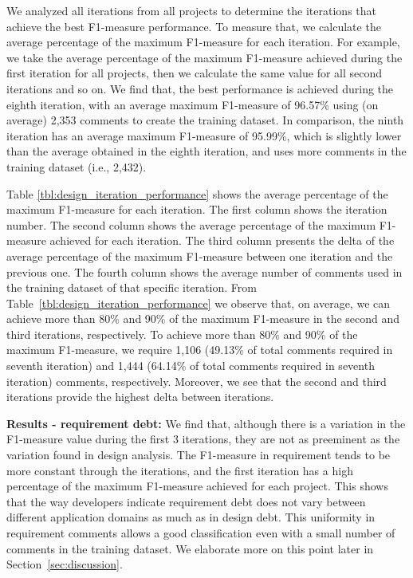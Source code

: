 We analyzed all iterations from all projects to determine the iterations that achieve the best F1-measure performance. To measure that, we calculate the average percentage of the maximum F1-measure for each iteration. For example, we take the average percentage of the maximum F1-measure achieved during the first iteration for all projects, then we calculate the same value for all second iterations and so on. We find that, the best performance is achieved during the eighth iteration, with an average maximum F1-measure of 96.57\% using (on average) 2,353 comments to create the training dataset. In comparison, the ninth iteration has an average  maximum F1-measure of 95.99\%, which is slightly lower than the average obtained in the eighth iteration, and uses more comments in the training dataset (i.e., 2,432).

Table \ref{tbl:design_iteration_performance} shows the average percentage of the maximum F1-measure for each iteration. The first column shows the iteration number. The second column shows the average percentage of the maximum F1-measure achieved for each iteration. The third column presents the delta of the average percentage of the maximum F1-measure between one iteration and the previous one. The fourth column shows the average number of comments used in the training dataset of that specific iteration. From Table~\ref{tbl:design_iteration_performance} we observe that, on average, we can achieve more than 80\% and 90\% of the maximum F1-measure in the second and third iterations, respectively. To achieve more than 80\% and 90\% of the maximum F1-measure, we require 1,106 (49.13\% of total comments required in seventh iteration) and 1,444 (64.14\% of total comments required in seventh iteration) comments, respectively. Moreover, we see that the second and third iterations provide the highest delta between iterations.

\noindent \textbf{Results - requirement debt:} We find that, although there is a variation in the F1-measure value during the first 3 iterations, they are not as preeminent as the variation found in design \SATD analysis. The F1-measure in requirement \SATD tends to be more constant through the iterations, and the first iteration has a high percentage of the maximum F1-measure achieved for each project. This shows that the way developers indicate requirement debt does not vary between different application domains as much as in design debt. This uniformity in requirement \SATD comments allows a good classification even with a small number of comments in the training dataset. We elaborate more on this point later in Section~\ref{sec:discussion}.

